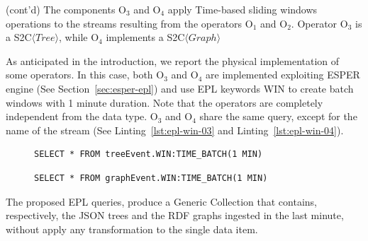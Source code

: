 \begin{Example}
(cont'd) The components O$_3$ and O$_4$ apply Time-based sliding windows operations to the streams resulting from the operators O$_1$ and O$_2$.
Operator O$_3$ is a S2C$\langle Tree \rangle$, while O$_4$ implements a S2C$\langle Graph \rangle$

As anticipated in the introduction, we report the physical implementation of some operators. In this case, both O$_3$ and O$_4$ are implemented exploiting ESPER engine (See Section~\ref{sec:esper-epl}) and use EPL keywords WIN to create batch windows with 1 minute duration.
Note that the operators are completely independent from the data type. O$_3$ and O$_4$ share the same query, except for the name of the stream (See Linting~\ref{lst:epl-win-03} and Linting~\ref{lst:epl-win-04}).

\begin{figure}[ht]
\begin{minipage}{0.95\linewidth}
\begin{lstlisting}[caption={EPL query, applied by O$_3$ operators, to window the stream of JSON trees},label=lst:epl-win-03,style=ESPER]
     SELECT * FROM treeEvent.WIN:TIME_BATCH(1 MIN) 
\end{lstlisting}
\end{minipage}
\end{figure}

\begin{figure}[ht]
\begin{minipage}{0.95\linewidth}
\begin{lstlisting}[caption={EPL query, applied by O$_4$ operators, to window the stream of RDF graphs},label=lst:epl-win-04,style=ESPER]
     SELECT * FROM graphEvent.WIN:TIME_BATCH(1 MIN) 
\end{lstlisting}
\end{minipage}
\end{figure}

The proposed EPL queries, produce a Generic Collection that contains, respectively, the JSON trees and the RDF graphs ingested in the last minute, without apply any transformation to the single data item.


\end{Example}
